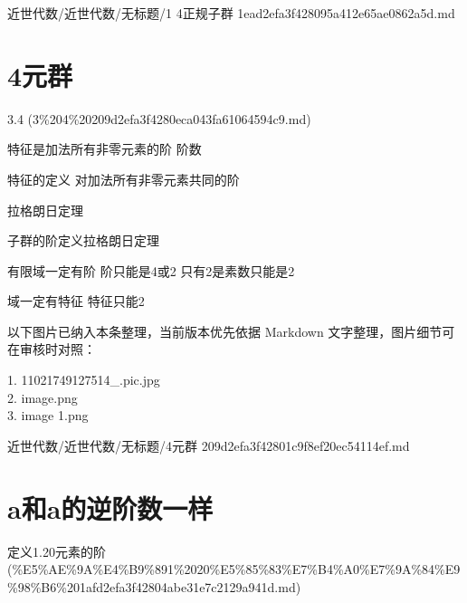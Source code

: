 \begin{note}[来源路径]

近世代数/近世代数/无标题/1 4正规子群 1ead2efa3f428095a412e65ae0862a5d.md

\end{note}

\section*{4元群}

\begin{note}[来源上级主题]

3.4 (3\%204\%20209d2efa3f4280eca043fa61064594c9.md)

\end{note}

\begin{note}[4元群]

特征是加法所有非零元素的阶   阶数

特征的定义  对加法所有非零元素共同的阶

拉格朗日定理

子群的阶定义拉格朗日定理

有限域一定有阶 阶只能是4或2 只有2是素数只能是2

域一定有特征 特征只能2

\end{note}

\begin{note}[关联图片]
以下图片已纳入本条整理，当前版本优先依据 Markdown 文字整理，图片细节可在审核时对照：

1. 11021749127514\_.pic.jpg\\
2. image.png\\
3. image 1.png\\

\end{note}

\begin{note}[来源路径]

近世代数/近世代数/无标题/4元群 209d2efa3f42801c9f8ef20ec54114ef.md

\end{note}

\section*{a和a的逆阶数一样}

\begin{note}[来源上级主题]

定义1.20元素的阶 (\%E5\%AE\%9A\%E4\%B9\%891\%2020\%E5\%85\%83\%E7\%B4\%A0\%E7\%9A\%84\%E9\%98\%B6\%201afd2efa3f42804abe31e7c2129a941d.md)

\end{note}

